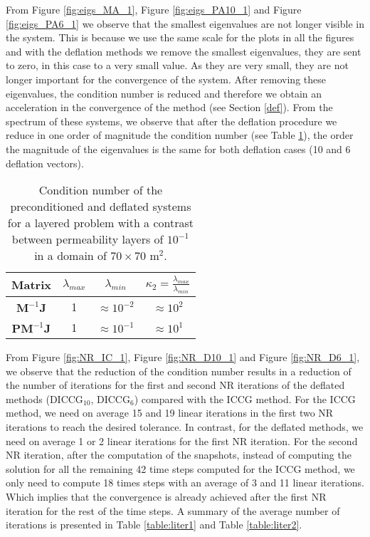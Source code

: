 \documentclass[12pt]{article}
\numberwithin{equation}{section}
\begin{document}
From Figure \ref{fig:eigs_MA_1}, Figure \ref{fig:eigs_PA10_1} and Figure \ref{fig:eigs_PA6_1} we observe that the smallest eigenvalues are not longer visible in the system. This is because we use the same scale for the plots in all the figures and with the deflation methods we remove the smallest eigenvalues, they are sent to zero, in this case to a very small value. As they are very small, they are not longer important for the convergence of the system. After removing these eigenvalues, the condition number is reduced and therefore we obtain an acceleration in the convergence of the method (see Section \ref{def}). From the spectrum of these systems, we observe that after the deflation procedure we reduce in one order of magnitude the condition number (see Table \ref{table:cn_1}), the order the magnitude of the eigenvalues is the same for both deflation cases (10 and 6 deflation vectors).\\

\begin{table}[!ht]\centering
\begin{minipage}{.7\textwidth}
\vspace{-10pt}
\centering
\begin{tabular}{ |c|c|c|c|} 
  \hline
 Matrix &$\lambda_{max}$ &$\lambda_{min}$ &$\kappa_2=\frac{\lambda_{max}}{\lambda_{min}}$  \\
  \hline
$\mathbf{M}^{-1}\mathbf{J}$ &1 & $\approx 10^{-2}$&$\approx 10^2$\\
$\mathbf{P}\mathbf{M}^{-1}\mathbf{J}$ &1 & $\approx 10^{-1}$&$\approx 10^1$\\
 \hline
 \end{tabular}
\caption{Condition number of the preconditioned and deflated systems for a layered problem with a contrast between permeability layers of $10^{-1}$ in a domain of $70 \times 70$ m$^2$.}\label{table:cn_1}
\end{minipage}
\end{table}

From Figure \ref{fig:NR_IC_1},  Figure \ref{fig:NR_D10_1} and Figure \ref{fig:NR_D6_1}, we observe that the reduction of the condition number results in a reduction of the number of iterations for the first and second NR iterations of the deflated methods (DICCG$_{10}$, DICCG$_6$) compared with the ICCG method. For the ICCG method, we need on average 15 and 19 linear iterations in the first two NR iterations to reach the desired tolerance. In contrast, for the deflated methods, we need on average 1 or 2 linear iterations for the first NR iteration. For the second NR iteration, after the computation of the snapshots, instead of computing the solution for all the remaining 42 time steps computed for the ICCG method, we only need to compute 18 times steps with an average of 3 and 11 linear iterations. Which implies that the convergence is already achieved after the first NR iteration for the rest of the time steps. A summary of the average number of iterations is presented in Table \ref{table:liter1} and Table \ref{table:liter2}.\\
\end{document}
